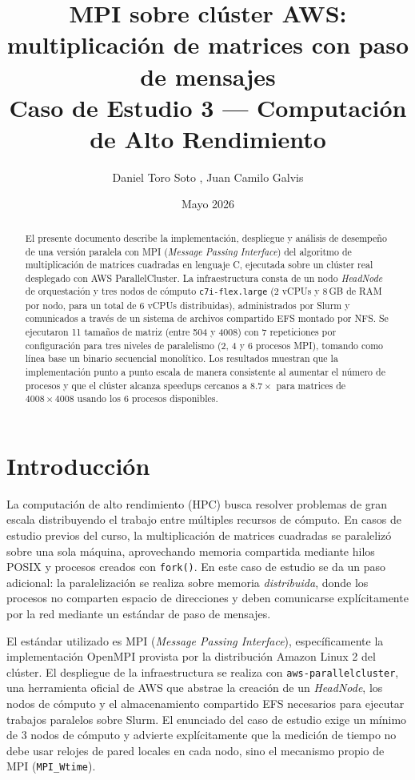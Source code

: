 \documentclass{article}
\title{MPI sobre clúster AWS: multiplicación de matrices con paso de mensajes\\[0.5em]
\large Caso de Estudio 3 --- Computación de Alto Rendimiento}
\author{Daniel Toro Soto , Juan Camilo Galvis}
\date{Mayo 2026}
\begin{document}
\maketitle

\begin{abstract}
El presente documento describe la implementación, despliegue y análisis de desempeño de una versión paralela con MPI (\emph{Message Passing Interface}) del algoritmo de multiplicación de matrices cuadradas en lenguaje C, ejecutada sobre un clúster real desplegado con AWS ParallelCluster. La infraestructura consta de un nodo \emph{HeadNode} de orquestación y tres nodos de cómputo \texttt{c7i-flex.large} (2 vCPUs y 8\,GB de RAM por nodo, para un total de 6 vCPUs distribuidas), administrados por Slurm y comunicados a través de un sistema de archivos compartido EFS montado por NFS. Se ejecutaron 11 tamaños de matriz (entre 504 y 4008) con 7 repeticiones por configuración para tres niveles de paralelismo (2, 4 y 6 procesos MPI), tomando como línea base un binario secuencial monolítico. Los resultados muestran que la implementación punto a punto escala de manera consistente al aumentar el número de procesos y que el clúster alcanza speedups cercanos a $8.7\times$ para matrices de $4008 \times 4008$ usando los 6 procesos disponibles.
\end{abstract}

\tableofcontents
\newpage

\section{Introducción}

La computación de alto rendimiento (HPC) busca resolver problemas de gran escala distribuyendo el trabajo entre múltiples recursos de cómputo. En casos de estudio previos del curso, la multiplicación de matrices cuadradas se paralelizó sobre una sola máquina, aprovechando memoria compartida mediante hilos POSIX y procesos creados con \texttt{fork()}. En este caso de estudio se da un paso adicional: la paralelización se realiza sobre memoria \emph{distribuida}, donde los procesos no comparten espacio de direcciones y deben comunicarse explícitamente por la red mediante un estándar de paso de mensajes.

El estándar utilizado es MPI (\emph{Message Passing Interface}), específicamente la implementación OpenMPI provista por la distribución Amazon Linux 2 del clúster. El despliegue de la infraestructura se realiza con \texttt{aws-parallelcluster}, una herramienta oficial de AWS que abstrae la creación de un \emph{HeadNode}, los nodos de cómputo y el almacenamiento compartido EFS necesarios para ejecutar trabajos paralelos sobre Slurm. El enunciado del caso de estudio exige un mínimo de 3 nodos de cómputo y advierte explícitamente que la medición de tiempo no debe usar relojes de pared locales en cada nodo, sino el mecanismo propio de MPI (\texttt{MPI\_Wtime}).
\end{document}
